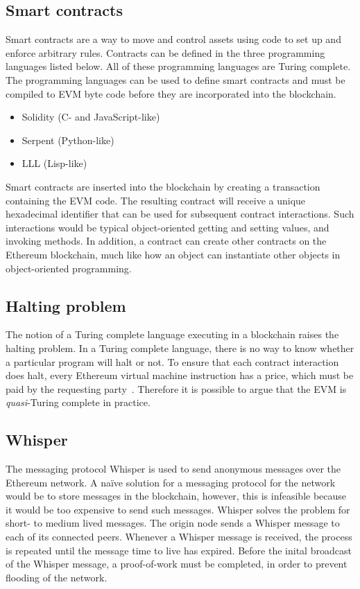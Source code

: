 \subsection{Smart contracts}
\label{sec:tech:contracts}
Smart contracts are a way to move and control assets using code to set up and enforce arbitrary rules. Contracts can be defined in the three programming languages listed below. All of these programming languages are Turing complete. The programming languages can be used to define smart contracts and must be compiled to EVM byte code before they are incorporated into the blockchain.

\begin{itemize}
    \item Solidity (C- and JavaScript-like)
    \item Serpent (Python-like)
    \item LLL (Lisp-like)
\end{itemize}

Smart contracts are inserted into the blockchain by creating a transaction containing the EVM code. The resulting contract will receive a unique hexadecimal identifier that can be used for subsequent contract interactions. Such interactions would be typical object-oriented getting and setting values, and invoking methods. In addition, a contract can create other contracts on the Ethereum blockchain, much like how an object can instantiate other objects in object-oriented programming.

\subsection{Halting problem}
The notion of a Turing complete language executing in a blockchain raises the halting problem. In a Turing complete language, there is no way to know whether a particular program will halt or not. To ensure that each contract interaction does halt, every Ethereum virtual machine instruction has a price, which must be paid by the requesting party~\cite{ethereum:yellow}. Therefore it is possible to argue that the EVM is \emph{quasi}-Turing complete in practice.

\subsection{Whisper}
The messaging protocol Whisper is used to send anonymous messages over the Ethereum network. A naïve solution for a messaging protocol for the network would be to store messages in the blockchain, however, this is infeasible because it would be too expensive to send such messages. Whisper solves the problem for short- to medium lived messages. The origin node sends a Whisper message to each of its connected peers. Whenever a Whisper message is received, the process is repeated until the message time to live has expired. Before the inital broadcast of the Whisper message, a proof-of-work must be completed, in order to prevent flooding of the network.

